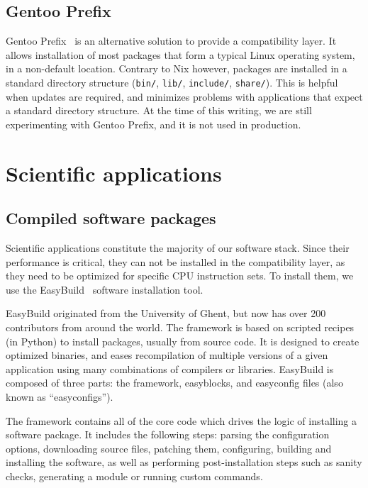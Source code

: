 \documentclass[sigconf]{acmart}
\begin{document}
\subsection{Gentoo Prefix}
\label{sub:Gentoo_Prefix}
Gentoo Prefix~\cite{Gentoo} is an alternative solution to provide a compatibility layer. It allows installation of most packages that form a typical Linux operating system, in a non-default location. Contrary to Nix however, packages are installed in a standard directory structure (\texttt{bin/}, \texttt{lib/}, \texttt{include/}, \texttt{share/}). This is helpful when updates are required, and minimizes problems with applications that expect a standard directory structure. At the time of this writing, we are still experimenting with Gentoo Prefix, and it is not used in production. 

\section{Scientific applications}
\label{sec:Scientific_applications}

\subsection{Compiled software packages}
\label{sub:Compiled_software_packages}
Scientific applications constitute the majority of our software stack. Since their performance is critical, they can not be installed in the compatibility layer, as they need to be optimized for specific CPU instruction sets. To install them, we use the EasyBuild~\cite{EasyBuild2012,EasyBuild2014,EasyBuild2016} software installation tool.

EasyBuild originated from the University of Ghent, but now has over 200 contributors from around the world. The framework is based on scripted recipes (in Python) to install packages, usually from source code. It is designed to create optimized binaries, and eases recompilation of multiple versions of a given application using many combinations of compilers or libraries. EasyBuild is composed of three parts: the framework, easyblocks, and easyconfig files (also known as ``easyconfigs''). 

The framework contains all of the core code which drives the logic of installing a software package. It includes the following steps: parsing the configuration options, downloading source files, patching them, configuring, building and installing the software, as well as performing post-installation steps such as sanity checks, generating a module or running custom commands. 
\end{document}
